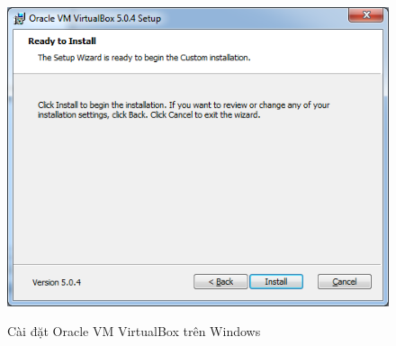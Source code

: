 \documentclass[13pt,a4paper]{extreport}
\begin{document}
\begin{itemize}
\begin{itemize}
\begin{figure}[!h]
\begin{center}
									{\includegraphics[scale=.5]{setup-genymotion-15}}
								\hspace{.5cm}
								\\								
							\end{center}
							\vspace{-.25cm}
							\caption{Cài đặt Oracle VM VirtualBox trên Windows}
							\label{Fig:setup-oracle-windows}
							\vspace{-.5cm}
						\end{figure}
						

\end{itemize}
\end{itemize}
\end{document}
